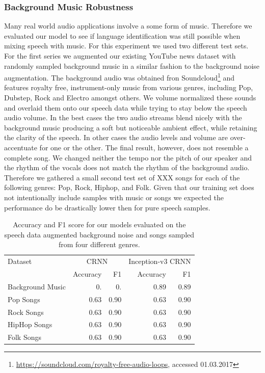 \subsubsection{Background Music Robustness} 
\label{sec:music_robustness}
Many real world audio applications involve a some form of music. Therefore we evaluated our model to see if language identification was still possible when mixing speech with music. For this experiment we used two different test sets. For the first series we augmented our existing YouTube news dataset with randomly sampled background music in a similar fashion to the background noise augmentation. The background audio was obtained fron Soundcloud\footnote{\url{https://soundcloud.com/royalty-free-audio-loops}, accessed 01.03.2017} and features royalty free, instrument-only music from various genres, including Pop, Dubstep, Rock and Electro amongst others. 
We volume normalized these sounds and overlaid them onto our speech data while trying to stay below the speech audio volume. In the best cases the two audio streams blend nicely with the background music producing a soft but noticeable ambient effect, while retaining the clarity of the speech. In other cases the audio levels and volume are over-accentuate for one or the other. The final result, however, does not resemble a complete song. We changed neither the tempo nor the pitch of our speaker and the rhythm of the vocals does not match the rhythm of the background audio. Therefore we gathered a small second test set of XXX  songs for each of the following genres: Pop, Rock, Hiphop, and Folk. 
Given that our training set does not intentionally include samples with music or songs we expected the performance do be drastically lower then for pure speech samples.

	\begin{table}[]
	\centering
	\begin{tabularx}{\textwidth}{lrrrr}
	\toprule
Dataset & \multicolumn{2}{c}{CRNN} & \multicolumn{2}{c}{Inception-v3 CRNN} \\   
                  & Accuracy  & F1    & Accuracy   & F1   \\ \midrule
Background Music  & 0.      & 0.  & 0.89  & 0.89 \\
Pop Songs         & 0.63      & 0.90  & 0.63  & 0.90 \\
Rock Songs        & 0.63      & 0.90  & 0.63  & 0.90 \\
HipHop Songs      & 0.63      & 0.90  & 0.63  & 0.90 \\
Folk Songs        & 0.63      & 0.90  & 0.63  & 0.90 \\

 	\bottomrule
	\end{tabularx}
	\caption{Accuracy and F1 score for our models evaluated on the speech data augmented background noise and songs sampled from four different genres.}
	\label{tab:audio_duration}
	\end{table}

